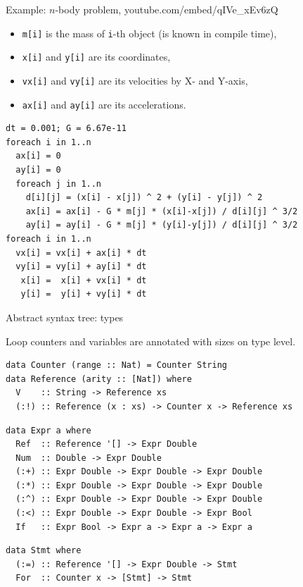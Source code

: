 \documentclass[handout]{beamer}
\begin{document}
\begin{frame}[fragile]{Example: $n$-body problem, {\normalsize youtube.com/embed/qIVe\_xEv6zQ}}

\begin{itemize}
\item {\tt m[i]} is the mass of {\tt i}-th object (is known in compile time),
\item {\tt x[i]} and {\tt y[i]} are its coordinates,
\item {\tt vx[i]} and {\tt vy[i]} are its velocities by X- and Y-axis,
\item {\tt ax[i]} and {\tt ay[i]} are its accelerations.
\end{itemize}

\begin{lstlisting}
dt = 0.001; G = 6.67e-11
foreach i in 1..n
  ax[i] = 0
  ay[i] = 0
  foreach j in 1..n
    d[i][j] = (x[i] - x[j]) ^ 2 + (y[i] - y[j]) ^ 2
    ax[i] = ax[i] - G * m[j] * (x[i]-x[j]) / d[i][j] ^ 3/2
    ay[i] = ay[i] - G * m[j] * (y[i]-y[j]) / d[i][j] ^ 3/2
foreach i in 1..n
  vx[i] = vx[i] + ax[i] * dt
  vy[i] = vy[i] + ay[i] * dt
   x[i] =  x[i] + vx[i] * dt
   y[i] =  y[i] + vy[i] * dt
\end{lstlisting}

\end{frame}

\begin{frame}[fragile]{Abstract syntax tree: types}

\vspace{-0.5ex}

Loop counters and variables are annotated with sizes on type level.

\begin{lstlisting}
data Counter (range :: Nat) = Counter String
data Reference (arity :: [Nat]) where
  V    :: String -> Reference xs
  (:!) :: Reference (x : xs) -> Counter x -> Reference xs
\end{lstlisting}

\begin{lstlisting}
data Expr a where
  Ref  :: Reference '[] -> Expr Double
  Num  :: Double -> Expr Double
  (:+) :: Expr Double -> Expr Double -> Expr Double
  (:*) :: Expr Double -> Expr Double -> Expr Double
  (:^) :: Expr Double -> Expr Double -> Expr Double
  (:<) :: Expr Double -> Expr Double -> Expr Bool
  If   :: Expr Bool -> Expr a -> Expr a -> Expr a
\end{lstlisting}

\begin{lstlisting}
data Stmt where
  (:=) :: Reference '[] -> Expr Double -> Stmt
  For  :: Counter x -> [Stmt] -> Stmt
\end{lstlisting}

\end{frame}
\end{document}
